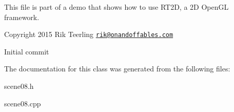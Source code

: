 This file is part of a demo that shows how to use R\+T2D, a 2D Open\+GL framework.


\begin{DoxyItemize}
\item Copyright 2015 Rik Teerling \href{mailto:rik@onandoffables.com}{\tt rik@onandoffables.\+com}
\begin{DoxyItemize}
\item Initial commit 
\end{DoxyItemize}
\end{DoxyItemize}

The documentation for this class was generated from the following files\+:\begin{DoxyCompactItemize}
\item 
scene08.\+h\item 
scene08.\+cpp\end{DoxyCompactItemize}
